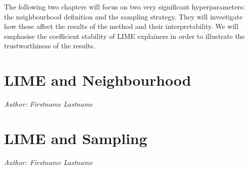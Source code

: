 \documentclass[
]{krantz}
\begin{document}
The following two chapters will focus on two very significant hyperparameters:
the neighbourhood definition and the sampling strategy.
They will investigate how these affect the results of the method and their interpretability.
We will emphasise the coefficient stability of LIME explainers in order to illustrate the trustworthiness of the results.

\hypertarget{lime-and-neighbourhood}{%
\chapter{LIME and Neighbourhood}\label{lime-and-neighbourhood}}

\emph{Author: Firstname Lastname}

\hypertarget{lime-and-sampling}{%
\chapter{LIME and Sampling}\label{lime-and-sampling}}

\emph{Author: Firstname Lastname}

  

\backmatter
\printindex
\end{document}
